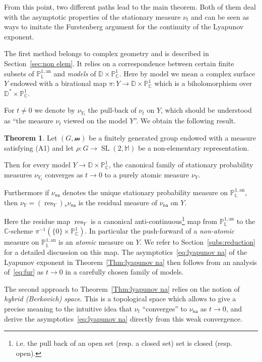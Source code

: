 \documentclass[10pt]{amsart}
\theoremstyle{definition}\newtheorem{defi}[theo]{Definition}\newtheorem{rema}[theo]{Remark}\newtheorem{exam}[theo]{Example}\newtheorem{exem}[theo]{Example}\newtheorem{nota}[theo]{Notation}
\DeclareMathOperator{\SL}{SL}
\DeclareMathOperator{\res}{res}
\newcommand{\cc}{\mathbb{C}}
\newcommand{\dD}{\mathbb{D}}
\newcommand{\sm}{\mathcal{m}}
\newcommand{\mm}{\mathbb{M}}
\newcommand{\D}{\mathbb{D}}
\newcommand{\an}{\mathrm{an}}
\newcommand{\cv}{\rightarrow}
\newcommand{\PP}{\mathbb{P}}
\newcommand{\Laurent}{\mathbb{L}}
\newcommand{\na}{\mathsf{na}}
\newtheorem{mthm}{Theorem}
\begin{document}

From this point, two different paths lead to the main theorem. Both of them deal with the asymptotic properties of the stationary measure $\nu_t$ and can be seen as ways to imitate the Furstenberg argument for the continuity of the Lyapunov exponent.


The first method belongs to complex geometry and is described in Section~\ref{sec:non elem}. It relies on a correspondence between certain finite subsets of $\PP^{1,\an}_{\Laurent}$ and \emph{models} of $\D \times \PP^1_\cc $. Here by model we mean a complex surface $Y$ endowed with a birational map $\pi: Y \to \D \times \PP^1_\cc$ which is a biholomorphism over $\D^*\times \PP^1_\cc$.

For $t\neq 0$ we denote by $\nu_{Y_t}$ the pull-back of $\nu_t$ on $Y$, which should be understood as ``the measure $\nu_t$ viewed on the model $Y$''. We obtain the following result.

\begin{mthm}\label{Thm:atomic}
Let $(G, \sm)$ be a finitely generated group endowed with a measure satisfying (A1) and let $\rho: G\to \SL(2, \mm)$ be a non-elementary representation.

Then for every model $Y\cv \dD\times \PP^1_\cc$, the canonical family of stationary probability measures $\nu_{Y_t}$ converges as $t\to 0$ to a purely atomic measure $\nu_{Y}$.

Furthermore if $\nu_\na$ denotes the unique stationary probability measure on $\PP^{1,\an}_{\Laurent}$, then $\nu_Y = (\res_Y)_*\nu_\na$ is the residual measure of $\nu_\na$ on $Y$.
\end{mthm}

Here the residue map $\res_Y$ is a canonical anti-continuous\footnote{i.e. the pull back of an open set (resp. a closed set) set is closed (resp. open).} map from $\PP^{1,\an}_{\Laurent}$ to the $\cc$-scheme $\pi^{-1}(\{ 0 \} \times \PP^1_\cc)$. In particular the push-forward of a \emph{non-atomic} measure on $\PP^{1,\an}_{\Laurent}$ is an \emph{atomic} measure on $Y$. We refer to Section~\ref{subs:reduction} for a detailed discussion on this map. The asymptotics~\eqref{eq:lyapunov na} of the Lyapunov exponent in Theorem~\ref{Thm:lyapunov na} then follows from an analysis of~\eqref{eq:fur} as $t\cv 0$ in a carefully chosen family of models.


The second approach to Theorem~\ref{Thm:lyapunov na} relies on the notion of \emph{hybrid (Berkovich) space}. This is a topological space which allows to give a precise meaning to the intuitive idea that $\nu_t$ ``converges'' to $\nu_\na$ as $t\to 0$, and derive the asymptotics~\eqref{eq:lyapunov na} directly from this weak convergence.
\end{document}
